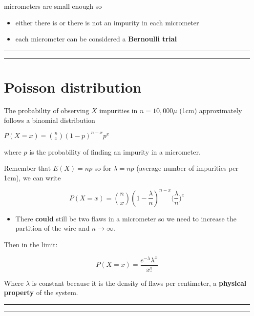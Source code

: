 \documentclass[
]{book}
\providecommand{\tightlist}{%
  \setlength{\itemsep}{0pt}\setlength{\parskip}{0pt}}
\begin{document}
micrometers are small enough so

\begin{itemize}
\tightlist
\item
  either there is or there is not an impurity in each micrometer
\item
  each micrometer can be considered a \textbf{Bernoulli trial}
\end{itemize}

\begin{center}\rule{0.5\linewidth}{0.5pt}\end{center}

\begin{center}\rule{0.5\linewidth}{0.5pt}\end{center}

\hypertarget{poisson-distribution-1}{%
\section{Poisson distribution}\label{poisson-distribution-1}}

The probability of observing \(X\) impurities in \(n=10,000\mu\) (1cm) approximately follows a binomial distribution

\(P(X=x)=\binom n x (1-p)^{n-x}p^x\)

where \(p\) is the probability of finding an impurity in a micrometer.

Remember that
\(E(X)=np\)
so for \(\lambda=np\) (average number of impurities per 1cm), we can write

\[P(X=x)=\binom n x (1-\frac{\lambda}{n})^{n-x}\big(\frac{\lambda}{n}\big)^x\]

\begin{itemize}
\tightlist
\item
  There \textbf{could} still be two flaws in a micrometer so we need to increase the partition of the wire and \(n \rightarrow \infty\).
\end{itemize}

Then in the limit:

\[P(X=x)= \frac{e^{-\lambda}\lambda^x}{x!}\]

Where \(\lambda\) is constant because it is the density of flaws per centimeter, a \textbf{physical property} of the system.

\begin{center}\rule{0.5\linewidth}{0.5pt}\end{center}

\begin{center}\rule{0.5\linewidth}{0.5pt}\end{center}
\end{document}
